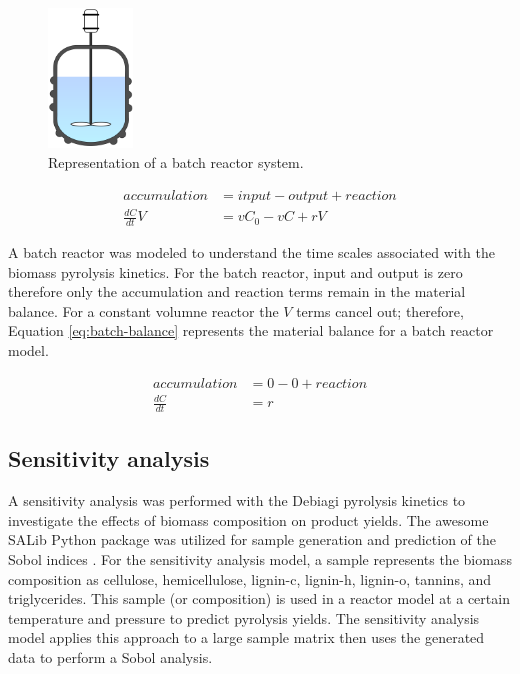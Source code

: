\begin{figure}[H]
    \centering
    \includegraphics[width=0.2\textwidth]{figures/batch-reactor.png}
    \caption{Representation of a batch reactor system.}
    \label{fig:batch-reactor}
\end{figure}

\begin{equation}
    \label{eq:typical-balance}
    \begin{aligned}
        accumulation &= input - output + reaction \\
        \frac{dC}{dt} V &= v C_0 - v C + r V
    \end{aligned}
\end{equation}

A batch reactor was modeled to understand the time scales associated with the biomass pyrolysis kinetics. For the batch reactor, input and output is zero therefore only the accumulation and reaction terms remain in the material balance. For a constant volumne reactor the $V$ terms cancel out; therefore, Equation \ref{eq:batch-balance} represents the material balance for a batch reactor model.

\begin{equation}
    \label{eq:batch-balance}
    \begin{aligned}
        accumulation &= 0 - 0 + reaction \\
        \frac{dC}{dt} &= r
    \end{aligned}
\end{equation}

\subsection{Sensitivity analysis}

A sensitivity analysis was performed with the Debiagi pyrolysis kinetics to investigate the effects of biomass composition on product yields. The awesome SALib Python package was utilized for sample generation and prediction of the Sobol indices \cite{Herman-2017}. For the sensitivity analysis model, a sample represents the biomass composition as cellulose, hemicellulose, lignin-c, lignin-h, lignin-o, tannins, and triglycerides. This sample (or composition) is used in a reactor model at a certain temperature and pressure to predict pyrolysis yields. The sensitivity analysis model applies this approach to a large sample matrix then uses the generated data to perform a Sobol analysis.
